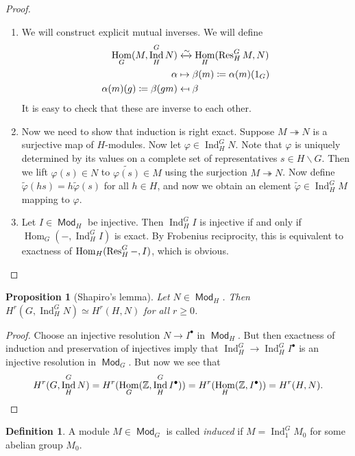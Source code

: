 \documentclass[leqno, openany]{memoir}
\newtheorem{prop}[thm]{Proposition}
\theoremstyle{definition}
\newtheorem{defn}[thm]{Definition}
\theoremstyle{remark}
\theoremstyle{plain}
\theoremstyle{definition}
\theoremstyle{remark}
\newcommand{\Z}{\mathbb{Z}}
\newcommand{\wt}[1]{\widetilde{#1}}
\DeclareMathOperator{\Hom}{Hom}
\DeclareMathOperator{\Mod}{\mathsf{Mod}}
\DeclareMathOperator{\Ind}{Ind}
\begin{document}
\begin{proof}\leavevmode
    \begin{enumerate}
        \item We will construct explicit mutual inverses. We will define
            \begin{align*} 
                \Hom_G(M, \Ind_H^G N) &\xleftrightarrow{\sim} \Hom_H(\Res_H^G M, N) \\
                            \alpha &\mapsto \beta(m) \coloneqq \alpha(m)(1_G) \\
                            \alpha(m)(g) \coloneqq \beta(gm) &\mapsfrom \beta
            \end{align*}
            It is easy to check that these are inverse to each other.
        \item Now we need to show that induction is right exact. Suppose $M \twoheadrightarrow N$ is a surjective map of $H$-modules. Now let $\varphi \in \Ind_H^G N$. Note that $\varphi$ is uniquely determined by its values on a complete set of representatives $s \in H \backslash G$. Then we lift $\varphi(s) \in N$ to $\wt{\varphi(s)} \in M$ using the surjection $M \twoheadrightarrow N$. Now define $\wt{\varphi}(hs) = h \wt{\varphi}(s)$ for all $h \in H$, and now we obtain an element $\wt{\varphi} \in \Ind_H^G M$ mapping to $\varphi$.
        \item Let $I \in \Mod_H$ be injective. Then $\Ind_H^G I$ is injective if and only if $\Hom_G(-, \Ind_H^G I)$ is exact. By Frobenius reciprocity, this is equivalent to exactness of $\Hom_H(\Res_H^G -, I)$, which is obvious. \qedhere
    \end{enumerate}
\end{proof}

\begin{prop}[Shapiro's lemma]
    Let $N \in \Mod_H$. Then $H^r(G, \Ind_H^G N) \simeq H^r(H, N)$ for all $r \geq 0$.
\end{prop}

\begin{proof}
    Choose an injective resolution $N \to I^{\bullet}$ in $\Mod_H$. But then exactness of induction and preservation of injectives imply that $\Ind_H^G \to \Ind_H^G I^{\bullet}$ is an injective resolution in $\Mod_G$. But now we see that
    \[ H^r(G, \Ind_H^G N) = H^r(\Hom_G (\Z, \Ind_H^G I^{\bullet})) = H^r(\Hom_H(\Z, I^{\bullet})) = H^r(H, N). \qedhere \]
\end{proof}

\begin{defn}
    A module $M \in \Mod_G$ is called \textit{induced} if $M = \Ind_1^G M_0$ for some abelian group $M_0$.
\end{defn}
\end{document}
